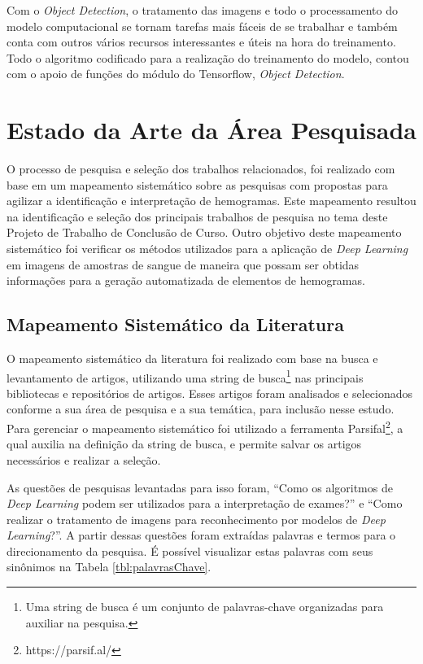 Com o \emph{Object Detection}, o tratamento das imagens e todo o processamento do modelo computacional se tornam tarefas mais fáceis de se trabalhar e também conta com outros vários recursos interessantes e úteis na hora do treinamento. Todo o algoritmo codificado para a realização do treinamento do modelo, contou com o apoio de funções do módulo do Tensorflow, \emph{Object Detection}.

\chapter{Estado da Arte da Área Pesquisada}
\label{chap:mapeamento}

O processo de pesquisa e seleção dos trabalhos relacionados, foi realizado com base em um mapeamento sistemático sobre as pesquisas com propostas para agilizar a identificação e interpretação de hemogramas. Este mapeamento resultou na identificação e seleção dos principais trabalhos de pesquisa no tema deste Projeto de Trabalho de Conclusão de Curso. Outro objetivo deste mapeamento sistemático foi verificar os métodos utilizados para a aplicação de \emph{Deep Learning} em imagens de amostras de sangue de maneira que possam ser obtidas informações para a geração automatizada de elementos de hemogramas.

\section{Mapeamento Sistemático da Literatura}

O mapeamento sistemático da literatura foi realizado com base na busca e levantamento de artigos, utilizando uma string de busca\footnote[1]{Uma string de busca é um conjunto de palavras-chave organizadas para auxiliar na pesquisa.} nas principais bibliotecas e repositórios de artigos. Esses artigos foram analisados e selecionados conforme a sua área de pesquisa e a sua temática, para inclusão nesse estudo. Para gerenciar o mapeamento sistemático foi utilizado a ferramenta Parsifal\footnote[2]{https://parsif.al/}, a qual auxilia na definição da string de busca, e permite salvar os artigos necessários e realizar a seleção.

As questões de pesquisas levantadas para isso foram, ``Como os algoritmos de \emph{Deep Learning} podem ser utilizados para a interpretação de exames?'' e ``Como realizar o tratamento de imagens para reconhecimento por modelos de \emph{Deep Learning}?''. A partir dessas questões foram extraídas palavras e termos para o direcionamento da pesquisa. É possível visualizar estas palavras com seus sinônimos na Tabela \ref{tbl:palavrasChave}.

